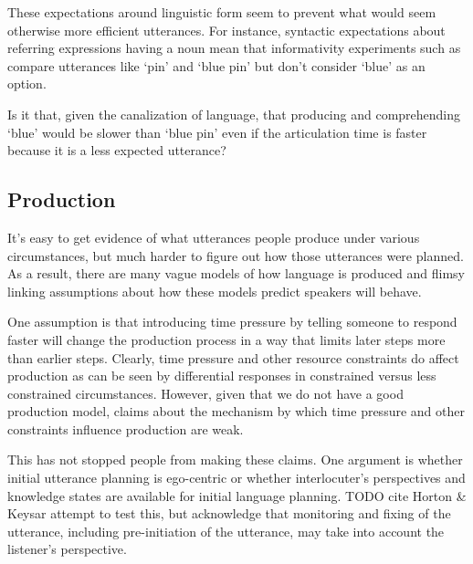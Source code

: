 \documentclass[]{article}
\begin{document}
These expectations around linguistic form seem to prevent what would seem otherwise more efficient utterances. For instance, syntactic expectations about referring expressions having a noun mean that informativity experiments such as \cite{degen20200406} compare utterances like `pin' and `blue pin' but don't consider `blue' as an option. 

Is it that, given the canalization of language, that producing and comprehending `blue' would be slower than `blue pin' even if the articulation time is faster because it is a less expected utterance? 


\subsection{Production}
It's easy to get evidence of what utterances people produce under various circumstances, but much harder to figure out how those utterances were planned. As a result, there are many vague models of how language is produced and flimsy linking assumptions about how these models predict speakers will behave. 
 

One assumption is that introducing time pressure by telling someone to respond faster will change the production process in a way that limits later steps more than earlier steps. Clearly, time pressure and other resource constraints do affect production as can be seen by differential responses in constrained versus less constrained circumstances. However, given that we do not have a good production model, claims about the mechanism by which time pressure and other constraints influence production are weak.

This has not stopped people from making these claims. One argument is whether initial utterance planning is ego-centric or whether interlocuter's perspectives and knowledge states are available for initial language planning. TODO cite Horton \& Keysar attempt to test this, but acknowledge that monitoring and fixing of the utterance, including pre-initiation of the utterance, may take into account the listener's perspective. %

%
\end{document}

